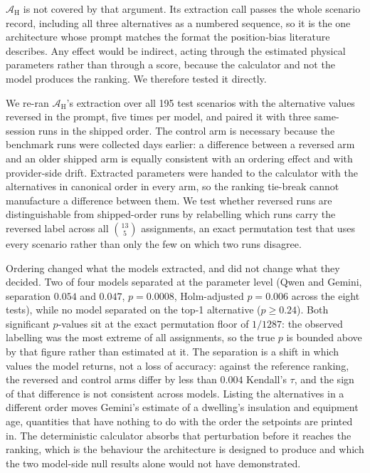 $\mathcal{A}_{\text{H}}$ is not covered by that argument. Its extraction call
passes the whole scenario record, including all three alternatives as a numbered
sequence, so it is the one architecture whose prompt matches the format the
position-bias literature describes. Any effect would be indirect, acting through
the estimated physical parameters rather than through a score, because the
calculator and not the model produces the ranking. We therefore tested it
directly.

We re-ran $\mathcal{A}_{\text{H}}$'s extraction over all 195 test scenarios with
the alternative values reversed in the prompt, five times per model, and paired
it with three same-session runs in the shipped order. The control arm is
necessary because the benchmark runs were collected days earlier: a difference
between a reversed arm and an older shipped arm is equally consistent with an
ordering effect and with provider-side drift. Extracted parameters were handed
to the calculator with the alternatives in canonical order in every arm, so the
ranking tie-break cannot manufacture a difference between them. We test whether
reversed runs are distinguishable from shipped-order runs by relabelling which
runs carry the reversed label across all $\binom{13}{5}$ assignments, an exact
permutation test that uses every scenario rather than only the few on which two
runs disagree.

Ordering changed what the models extracted, and did not change what they
decided. Two of four models separated at the parameter level (Qwen and Gemini,
separation $0.054$ and $0.047$, $p = 0.0008$, Holm-adjusted $p = 0.006$ across
the eight tests), while no model separated on the top-1 alternative
($p \geq 0.24$). Both significant $p$-values sit at the exact permutation floor
of $1/1287$: the observed labelling was the most extreme of all assignments, so
the true $p$ is bounded above by that figure rather than estimated at it. The
separation is a shift in which values the model returns, not a loss of accuracy:
against the reference ranking, the reversed and control arms differ by less than
$0.004$ Kendall's $\tau$, and the sign of that difference is not consistent
across models. Listing the alternatives in a
different order moves Gemini's estimate of a dwelling's insulation and equipment
age, quantities that have nothing to do with the order the setpoints are printed
in. The deterministic calculator absorbs that perturbation before it reaches the
ranking, which is the behaviour the architecture is designed to produce and
which the two model-side null results alone would not have demonstrated.

